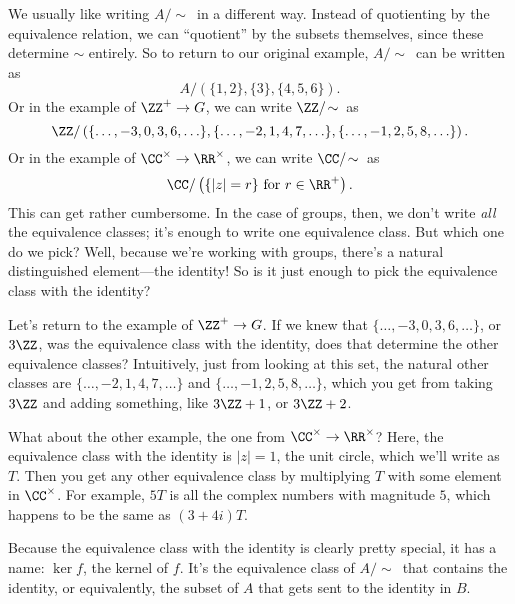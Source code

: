 \documentclass[11pt,paper=letter]{scrartcl}
\newcommand{\simm}{\!\sim\,}
\begin{document}
We usually like writing $A/\simm$ in a different way. Instead of quotienting by the equivalence relation, we can ``quotient'' by the subsets themselves, since these determine $\sim$ entirely. So to return to our original example, $A/\simm$ can be written as
\[
  A/\left(\{1, 2\}, \{3\}, \{4, 5, 6\}\right).
\]
Or in the example of $\ZZ^+ \to G$, we can write $\ZZ/\simm$ as
\[
  \ZZ/\left(\{\ldots, -3, 0, 3, 6, \ldots\}, \{\ldots, -2, 1, 4, 7, \ldots\},\{\ldots, -1, 2, 5, 8, \ldots\}\right).
\]
Or in the example of $\CC^{\times} \to \RR^\times$, we can write $\CC/\simm$ as
\[
  \CC/\left(\{|z| = r\} \text{ for } r \in \RR^{+}\right).
\]
This can get rather cumbersome. In the case of groups, then, we don't write \textit{all} the equivalence classes; it's enough to write one equivalence class. But which one do we pick? Well, because we're working with groups, there's a natural distinguished element---the identity! So is it just enough to pick the equivalence class with the identity?

\begin{example*}
Let's return to the example of $\ZZ^+ \to G$. If we knew that $\{\ldots, -3, 0, 3, 6, \ldots\}$, or $3\ZZ$, was the equivalence class with the identity, does that determine the other equivalence classes? Intuitively, just from looking at this set, the natural other classes are $\{\ldots, -2, 1, 4, 7, \ldots\}$ and $\{\ldots, -1, 2, 5, 8, \ldots\}$, which you get from taking $3\ZZ$ and adding something, like $3\ZZ + 1$, or $3\ZZ + 2$.
\end{example*}

\begin{example*}
What about the other example, the one from $\CC^{\times} \to \RR^{\times}$? Here, the equivalence class with the identity is $|z| = 1$, the unit circle, which we'll write as $T$. Then you get any other equivalence class by multiplying $T$ with some element in $\CC^{\times}$. For example, $5T$ is all the complex numbers with magnitude $5$, which happens to be the same as $(3 + 4i)T$.
\end{example*}

Because the equivalence class with the identity is clearly pretty special, it has a name: $\ker f$, the kernel of $f$. It's the equivalence class of $A/\simm$ that contains the identity, or equivalently, the subset of $A$ that gets sent to the identity in $B$.
\end{document}
